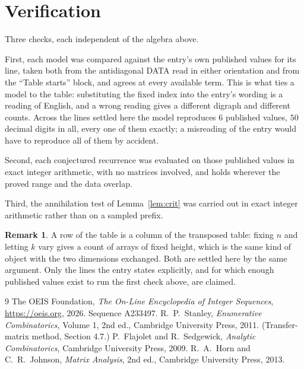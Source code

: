 \documentclass[11pt,a4paper]{article}
\theoremstyle{plain}
\theoremstyle{definition}
\newtheorem{remark}[theorem]{Remark}
\begin{document}
\section{Verification}

Three checks, each independent of the algebra above.

First, each model was compared against the entry's own published values for its line, taken
both from the antidiagonal DATA read in either orientation and from the ``Table starts''
block, and agrees at every available term. This is what ties a model to the table:
substituting the fixed index into the entry's wording is a reading of English, and a wrong
reading gives a different digraph and different counts. Across the lines settled here the
model reproduces $6$ published values, $50$ decimal digits in all, every one of
them exactly; a misreading of the entry would have to reproduce all of them by accident.

Second, each conjectured recurrence was evaluated on those published values in exact
integer arithmetic, with no matrices involved, and holds wherever the proved range and the
data overlap.

Third, the annihilation test of Lemma~\ref{lem:crit} was carried out in exact integer
arithmetic rather than on a sampled prefix.

\begin{remark}
A row of the table is a column of the transposed table: fixing $n$ and letting $k$ vary gives a
count of arrays of fixed height, which is the same kind of object with the two dimensions
exchanged. Both are settled here by the same argument. Only the lines the entry states
explicitly, and for which enough published values exist to run the first check above, are
claimed.
\end{remark}

\begin{thebibliography}{9}
 The OEIS Foundation, \emph{The On-Line Encyclopedia of Integer
Sequences}, \url{https://oeis.org}, 2026. Sequence A233497.
 R.~P.~Stanley, \emph{Enumerative Combinatorics}, Volume 1, 2nd ed.,
Cambridge University Press, 2011. (Transfer-matrix method, Section 4.7.)
 P.~Flajolet and R.~Sedgewick, \emph{Analytic Combinatorics}, Cambridge
University Press, 2009.
 R.~A.~Horn and C.~R.~Johnson, \emph{Matrix Analysis}, 2nd ed., Cambridge
University Press, 2013.
\end{thebibliography}
\end{document}
